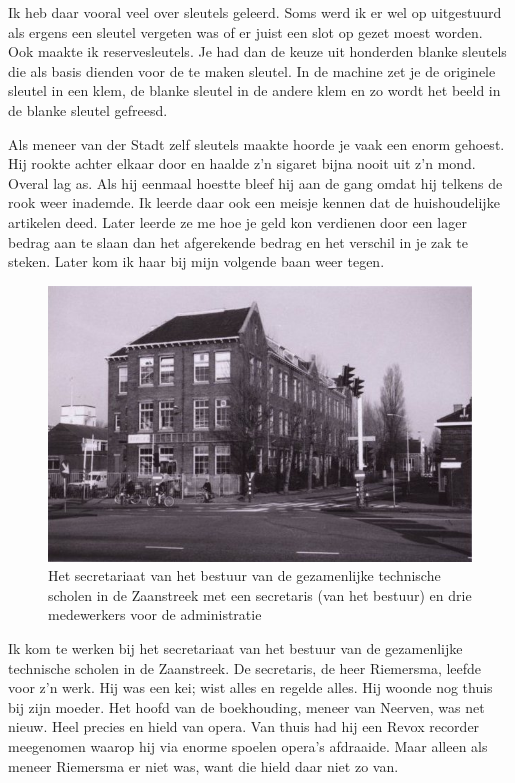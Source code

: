 \documentclass[12pt,twoside, openright]{memoir}
\begin{document}
Ik heb daar vooral veel over sleutels geleerd. Soms werd ik er wel op uitgestuurd als ergens een sleutel vergeten was of er juist een slot op gezet moest worden. Ook maakte ik reservesleutels. Je had dan de keuze uit honderden blanke sleutels die als basis dienden voor de te maken sleutel. In de machine zet je de originele sleutel in een klem, de blanke sleutel in de andere klem en zo wordt het beeld in de blanke sleutel gefreesd. 

Als meneer van der Stadt zelf sleutels maakte hoorde je vaak een enorm gehoest. Hij rookte achter elkaar door en haalde z’n sigaret bijna nooit uit z’n mond. Overal lag as. Als hij eenmaal hoestte bleef hij aan de gang omdat hij telkens de rook weer inademde. Ik leerde daar ook een meisje kennen dat de huishoudelijke artikelen deed. Later leerde ze me hoe je geld kon verdienen door een lager bedrag aan te slaan dan het afgerekende bedrag en het verschil in je zak te steken. Later kom ik haar bij mijn volgende baan weer tegen. 

\begin{figure}
\centering
\includegraphics[width=\textwidth]{img/247school}
\caption*{\footnotesize Het secretariaat van het bestuur van de gezamenlijke technische scholen in de Zaanstreek met een secretaris (van het bestuur) en drie medewerkers voor de administratie}
\end{figure}

Ik kom te werken bij het secretariaat van het bestuur van de gezamenlijke technische scholen in de Zaanstreek. De secretaris, de heer Riemersma, leefde voor z'n werk. Hij was een kei; wist alles en regelde alles. Hij woonde nog thuis bij zijn moeder. Het hoofd van de boekhouding, meneer van Neerven, was net nieuw. Heel precies en hield van opera. Van thuis had hij een Revox recorder meegenomen waarop hij via enorme spoelen opera's afdraaide. Maar alleen als meneer Riemersma er niet was, want die hield daar niet zo van.
\end{document}
